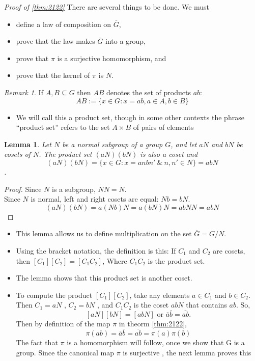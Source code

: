 \documentclass[
]{book}
\providecommand{\tightlist}{%
  \setlength{\itemsep}{0pt}\setlength{\parskip}{0pt}}
\newtheorem{lemma}{Lemma}[chapter]
\theoremstyle{definition}
\theoremstyle{definition}
\theoremstyle{definition}
\theoremstyle{definition}
\theoremstyle{remark}
\newtheorem*{remark}{Remark}
\begin{document}
\emph{Proof of \ref{thm:2122}}
There are several things to be done. We must

\begin{itemize}
\tightlist
\item
  define a law of composition on \(\overline{G}\),
\item
  prove that the law makes \(\overline{G}\) into a group,
\item
  prove that \(\pi\) is a surjective homomorphism, and
\item
  prove that the kernel of \(\pi\) is \(N\).
\end{itemize}

\begin{remark}

If \(A,B \subseteq G\) then \(AB\) denotes the set of products \(ab\):
\[AB:=\{x\in G: x=ab, a\in A, b\in B\}\]

\begin{itemize}
\tightlist
\item
  We will call this a product set, though in some other contexts the phrase ``product set'' refers
  to the set \(A \times B\) of pairs of elements
\end{itemize}

\end{remark}

\begin{lemma}
\protect\hypertarget{lem:2125}{}\label{lem:2125}Let \(N\) be a normal subgroup of a group \(G\), and let \(a N\) and \(b N\) be cosets of \(N\). The product set \((aN )(bN )\) is also a coset and \[(aN )(bN )=\{x\in G: x=anbn' ~\& ~ n,n'\in N\}=abN\].
\end{lemma}

\begin{proof}
Since \(N\) is a subgroup, \(N N = N\).\\
Since \(N\) is normal, left and right cosets are equal:
\(N b = bN\).
\[(aN )(bN ) = a (N b )N = a (b N )N = a b N N = abN\]
\end{proof}

\begin{itemize}
\tightlist
\item
  This lemma allows us to define multiplication on the set \(\overline{G} = G / N\).
\item
  Using the bracket
  notation, the definition is this: If \(C_1\) and \(C_2\) are cosets, then \([C_1][C_2] = [C_1 C_2]\),
  Where \(C_1 C_2\) is the product set.
\item
  The lemma shows that this product set is another coset.\\
\item
  To compute the product \([C_1][C_2]\), take any elements \(a \in C_1\) and \(b \in C_2\). Then \(C_1 = aN\) ,
  \(C_2 = bN\) , and \(C_1 C_2\) is the coset \(a b N\) that contains \(ab\). So,
  \[[aN][bN] = [abN] \text{ or } \overline{a}\overline{b} = \overline{ab}.\]
  Then by definition of the map \(\pi\) in theorm \ref{thm:2122},
  \[\pi(ab)=\overline{a}\overline{b} = \overline{ab}=\pi(a)\pi(b)\]
  The fact that \(\pi\) is a homomorphism will follow, once we show that G is a group.
  Since the canonical map \(\pi\) is surjective , the next lemma proves this
\end{itemize}
\end{document}
